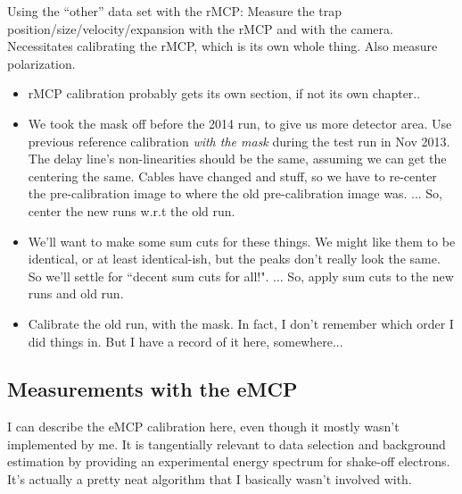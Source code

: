 	Using the ``other'' data set with the rMCP:  Measure the trap position/size/velocity/expansion with the rMCP and with the camera.  Necessitates calibrating the rMCP, which is its own whole thing.  Also measure polarization.
		\begin{itemize}
		\item rMCP calibration probably gets its own section, if not its own chapter..
		\item We took the mask off before the 2014 run, to give us more detector area.  Use previous reference calibration \emph{with the mask} during the test run in Nov 2013.  The delay line's non-linearities should be the same, assuming we can get the centering the same.  Cables have changed and stuff, so we have to re-center the pre-calibration image to where the old pre-calibration image was.  ...  So, center the new runs w.r.t the old run.
		\item We'll want to make some sum cuts for these things.  We might like them to be identical, or at least identical-ish, but the peaks don't really look the same.  So we'll settle for ``decent sum cuts for all!".  ...  So, apply sum cuts to the new runs and old run.
		\item Calibrate the old run, with the mask.  In fact, I don't remember which order I did things in.  But I have a record of it here, somewhere...
		\end{itemize}


\subsection{Measurements with the eMCP}
	I can describe the eMCP calibration here, even though it mostly wasn't implemented by me.  It is tangentially relevant to data selection and background estimation by providing an experimental energy spectrum for shake-off electrons.  It's actually a pretty neat algorithm that I basically wasn't involved with.




